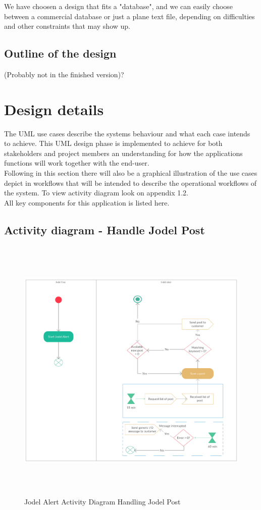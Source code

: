 \documentclass[a4paper,12pt]{article}
\begin{document}
We have choosen a design that fits a "database", and we can easily choose between a commercial database or just a plane text file, depending on difficulties and other constraints that may show up.\\


\subsection{Outline of the design}
(Probably not in the finished version)?
\clearpage
\section{Design details}
The UML use cases describe the systems behaviour and what each case intends to achieve. This UML design phase is implemented to achieve for both stakeholders and project members an understanding for how the applications functions will work together with the end-user.  \\

Following in this section there will also be a graphical illustration of the use cases depict in workflows that will be intended to describe the operational workflows of the system. To view activity diagram look on appendix 1.2.\\

All key components for this application is listed here.\\
\subsection{Activity diagram - Handle Jodel Post}
\begin{figure}[!h]
	\centering
	\includegraphics[height=13cm]{img/Activity_diagram-Handling_Jodel_post.pdf}
	\caption{Jodel Alert Activity Diagram Handling Jodel Post}
	\label{Jodel}
\end{figure}
\clearpage
\end{document}
